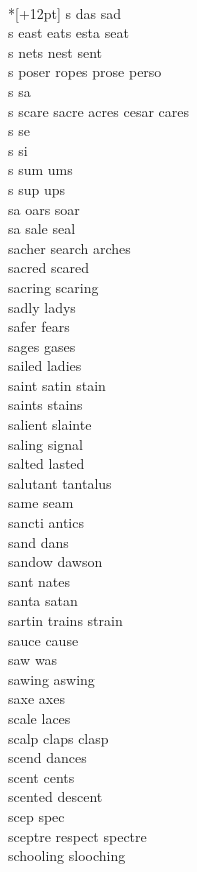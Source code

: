 \vspace{14pt}
\noindent\notextbf{\LargeS}\\*[+12pt]
s das sad  \\
s east eats esta seat   \\
s nets nest sent   \\
s poser ropes prose perso    \\
s sa \\
s scare sacre acres cesar cares    \\
s se \\
s si \\
s sum ums  \\
s sup ups  \\
sa oars soar  \\
sa sale seal  \\
sacher search arches\\
sacred scared\\
sacring scaring\\
sadly ladys\\
safer fears\\
sages gases\\
sailed ladies\\
saint satin stain\\
saints stains\\
salient slainte\\
saling signal\\
salted lasted\\
salutant tantalus\\
same seam\\
sancti antics\\
sand dans\\
sandow dawson\\
sant nates \\
santa satan\\
sartin trains strain\\
sauce cause\\
saw was\\
sawing aswing\\
saxe axes\\
scale laces\\
scalp claps clasp\\
scend dances \\
scent cents\\
scented descent\\
scep spec\\
sceptre respect spectre\\
schooling slooching\\
